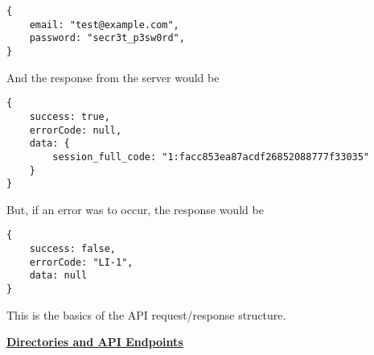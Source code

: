 \documentclass{article}[11pt]
\begin{document}
\begin{verbatim}
{     
    email: "test@example.com",
    password: "secr3t_p3sw0rd",
}
\end{verbatim}

And the response from the server would be 
\begin{verbatim}
{     
    success: true,
    errorCode: null,
    data: {
    	session_full_code: "1:facc853ea87acdf26852088777f33035"
    }
}
\end{verbatim}

But, if an error was to occur, the response would be
\begin{verbatim}
{     
    success: false,
    errorCode: "LI-1",
    data: null
}
\end{verbatim}

This is the basics of the API request/response structure.

\newpage


\newcommand{\ErrorsBasic}{

\noindent
\textbf{Error Codes:} \\
W-0: Failure - Empty or null request body \\
}

\newcommand{\ErrorsMysql}{
\ErrorsBasic
W-1: Exception - An unknown error occurred in connecting to the database.  \\
W-2: Exception - An unknown error occurred in the server.  \\
}

\newcommand{\ErrorsSession}{
\ErrorsMysql
W-3: Failure - session\_full\_code was empty or null.  \\
W-4: Failure - session\_full\_code was invalid. Make sure its a valid session code received from /user/login.  \\
W-5: Exception - An unknown error occurred in the server.  \\
W-6: Exception - An unknown error occurred in finding the session.  \\
}




\noindent
\textbf{\underline{Directories and API Endpoints}} \\
\end{document}
